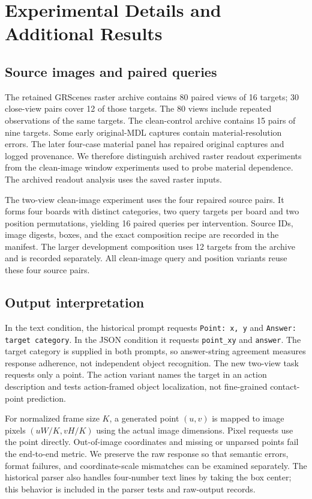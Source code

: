 \section{Experimental Details and Additional Results}
\label{app:details}

\subsection{Source images and paired queries}
The retained GRScenes raster archive contains 80 paired views of 16 targets;
30 close-view pairs cover 12 of those targets. The 80 views include repeated observations of the same targets. The clean-control archive contains 15 pairs of nine
targets. Some early original-MDL captures contain material-resolution errors.
The later four-case material panel has repaired original captures and logged
provenance. We therefore distinguish archived raster readout experiments from
the clean-image window experiments used to probe material dependence. The archived readout analysis uses the saved raster inputs.

The two-view clean-image experiment uses the four repaired source pairs. It
forms four boards with distinct categories, two query targets per board and two
position permutations, yielding 16 paired queries per intervention. Source
IDs, image digests, boxes, and the exact composition recipe are recorded in
the manifest. The larger development composition uses 12 targets from the
archive and is recorded separately. All clean-image query and position variants reuse these four source pairs.

\subsection{Output interpretation}
In the text condition, the historical prompt requests \texttt{Point: x, y} and
\texttt{Answer: target category}. In the JSON condition it requests
\texttt{point\_xy} and \texttt{answer}. The target category is supplied in both
prompts, so answer-string agreement measures response adherence, not independent
object recognition. The new two-view task requests only a point. The action
variant names the target in an action description and tests action-framed object
localization, not fine-grained contact-point prediction.

For normalized frame size $K$, a generated point $(u,v)$ is mapped to image
pixels $(uW/K,vH/K)$ using the actual image dimensions. Pixel requests use the
point directly. Out-of-image coordinates and missing or unparsed points fail
the end-to-end metric. We preserve the raw response so that semantic errors,
format failures, and coordinate-scale mismatches can be examined separately.
The historical parser also handles four-number text lines by taking the box
center; this behavior is included in the parser tests and raw-output records.

